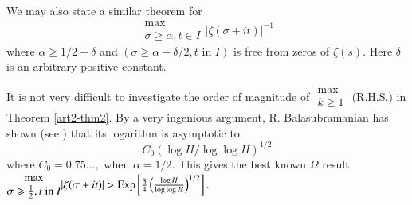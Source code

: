 \begin{remark*}
We may also state a similar theorem for 
$$
\begin{matrix}
\max\\
\sigma \geqslant \alpha, t \in I
\end{matrix} |\zeta (\sigma + it)|^{-1}
$$
where $\alpha \geqslant 1/2 + \delta$ and $(\sigma \geqslant \alpha - \delta/2, t \text{ in } I)$ is free from zeros of $\zeta(s)$. Here $\delta$ is an arbitrary positive constant. 

It is not very difficult to investigate the order of magnitude of $\begin{matrix}
\max\\ k \geqslant 1
\end{matrix}$ (R.H.S.) in Theorem \ref{art2-thm2}. By a very ingenious argument, R. Balasubramanian has shown (see \cite{art2-key1}) that its logarithm is asymptotic to 
$$
C_0 (\log H/ \log \log H)^{1/2}
$$
where $C_0 = 0.75 \ldots, $ when $\alpha =1/2$. This gives the best known $\Omega$ result
$\begin{matrix}
\max\\
\sigma \geqslant \frac{1}{2}, t \text{ in  } I 
\end{matrix}|\zeta (\sigma + it) | > \operatorname{Exp} \left[\frac{3}{4} \left(\frac{\log H}{\log \log H} \right)^{1/2} \right].$ 


\end{remark*}
